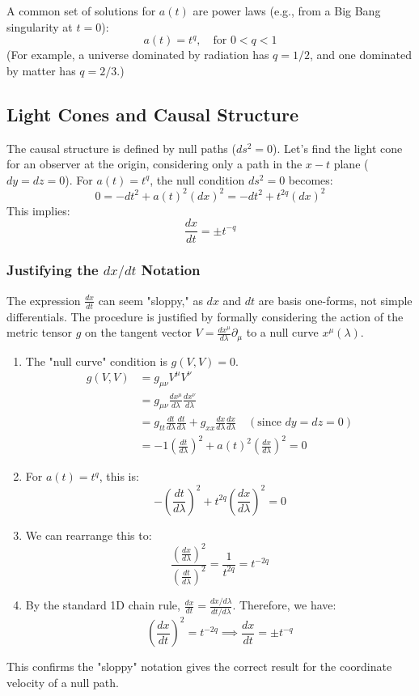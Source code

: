 \documentclass[11pt, a4paper]{report}
\begin{document}
A common set of solutions for $a(t)$ are power laws (e.g., from a Big Bang singularity at $t=0$):
\begin{equation}
    a(t) = t^q, \quad \text{for } 0 < q < 1
\end{equation}
(For example, a universe dominated by radiation has $q=1/2$, and one dominated by matter has $q=2/3$.)

\subsection*{Light Cones and Causal Structure}
The causal structure is defined by null paths ($ds^2=0$). Let's find the light cone for an observer at the origin, considering only a path in the $x-t$ plane ($dy=dz=0$). For $a(t) = t^q$, the null condition $ds^2=0$ becomes:
\[
    0 = -dt^2 + a(t)^2 (dx)^2 = -dt^2 + t^{2q} (dx)^2
\]
This implies:
\begin{equation}
    \frac{dx}{dt} = \pm t^{-q}
\end{equation}

\subsubsection*{Justifying the $dx/dt$ Notation}
The expression $\frac{dx}{dt}$ can seem "sloppy," as $dx$ and $dt$ are basis one-forms, not simple differentials. The procedure is justified by formally considering the action of the metric tensor $g$ on the tangent vector $V = \frac{dx^\mu}{d\lambda} \partial_\mu$ to a null curve $x^\mu(\lambda)$.

\begin{enumerate}
    \item The "null curve" condition is $g(V,V) = 0$.
    \begin{align*}
        g(V,V) &= g_{\mu\nu} V^\mu V^\nu \\
               &= g_{\mu\nu} \frac{dx^\mu}{d\lambda} \frac{dx^\nu}{d\lambda} \\
               &= g_{tt} \frac{dt}{d\lambda} \frac{dt}{d\lambda} + g_{xx} \frac{dx}{d\lambda} \frac{dx}{d\lambda} \quad (\text{since } dy=dz=0) \\
               &= -1 \left(\frac{dt}{d\lambda}\right)^2 + a(t)^2 \left(\frac{dx}{d\lambda}\right)^2 = 0
    \end{align*}
    \item For $a(t) = t^q$, this is:
    \begin{equation}
        -\left(\frac{dt}{d\lambda}\right)^2 + t^{2q} \left(\frac{dx}{d\lambda}\right)^2 = 0
    \end{equation}
    \item We can rearrange this to:
    \[
        \frac{\left(\frac{dx}{d\lambda}\right)^2}{\left(\frac{dt}{d\lambda}\right)^2} = \frac{1}{t^{2q}} = t^{-2q}
    \]
    \item By the standard 1D chain rule, $\frac{dx}{dt} = \frac{dx/d\lambda}{dt/d\lambda}$. Therefore, we have:
    \[
        \left(\frac{dx}{dt}\right)^2 = t^{-2q} \implies \frac{dx}{dt} = \pm t^{-q}
    \]
\end{enumerate}
This confirms the "sloppy" notation gives the correct result for the coordinate velocity of a null path.
\end{document}
